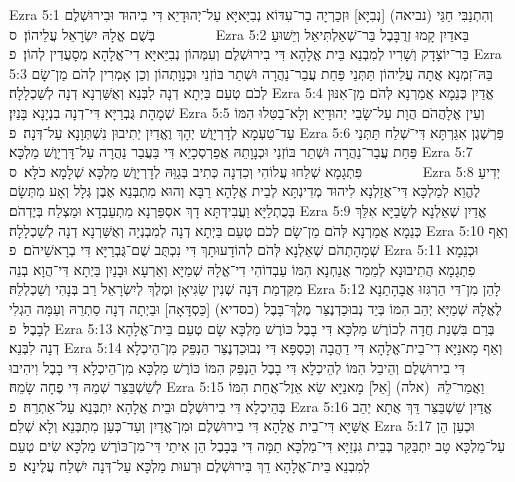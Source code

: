 Ezra 5:1	וְהִתְנַבִּי חַגַּי (נביאה) [נְבִיָּא] וּזְכַרְיָה בַר־עִדּוֹא נְבִיַּאיָּא עַל־יְהוּדָיֵא דִּי בִיהוּד וּבִירוּשְׁלֶם בְּשֻׁם אֱלָהּ יִשְׂרָאֵל עֲלֵיהוֹן׃ {ס}        
Ezra 5:2	בֵּאדַיִן קָמוּ זְרֻבָּבֶל בַּר־שְׁאַלְתִּיאֵל וְיֵשׁוּעַ בַּר־יוֹצָדָק וְשָׁרִיו לְמִבְנֵא בֵּית אֱלָהָא דִּי בִירוּשְׁלֶם וְעִמְּהוֹן נְבִיַּאיָּא דִי־אֱלָהָא מְסָעֲדִין לְהוֹן׃ {פ}
Ezra 5:3	בֵּהּ־זִמְנָא אֲתָה עֲלֵיהוֹן תַּתְּנַי פַּחַת עֲבַר־נַהֲרָה וּשְׁתַר בּוֹזְנַי וּכְנָוָתְהוֹן וְכֵן אָמְרִין לְהֹם מַן־שָׂם לְכֹם טְעֵם בַּיְתָא דְנָה לִבְּנֵא וְאֻשַּׁרְנָא דְנָה לְשַׁכְלָלָה׃
Ezra 5:4	אֱדַיִן כְּנֵמָא אֲמַרְנָא לְּהֹם מַן־אִנּוּן שְׁמָהָת גֻּבְרַיָּא דִּי־דְנָה בִנְיָנָא בָּנַיִן׃
Ezra 5:5	וְעֵין אֱלָהֲהֹם הֲוָת עַל־שָׂבֵי יְהוּדָיֵא וְלָא־בַטִּלוּ הִמּוֹ עַד־טַעְמָא לְדָרְיָוֶשׁ יְהָךְ וֶאֱדַיִן יְתִיבוּן נִשְׁתְּוָנָא עַל־דְּנָה׃ {פ}
Ezra 5:6	פַּרְשֶׁגֶן אִגַּרְתָּא דִּי־שְׁלַח תַּתְּנַי  פַּחַת עֲבַר־נַהֲרָה וּשְׁתַר בּוֹזְנַי וּכְנָוָתֵהּ אֲפַרְסְכָיֵא דִּי בַּעֲבַר נַהֲרָה עַל־דָּרְיָוֶשׁ מַלְכָּא׃
Ezra 5:7	פִּתְגָמָא שְׁלַחוּ עֲלוֹהִי וְכִדְנָה כְּתִיב בְּגַוֵּהּ לְדָרְיָוֶשׁ מַלְכָּא שְׁלָמָא כֹלָּא׃ {ס}        
Ezra 5:8	יְדִיעַ  לֶהֱוֵא לְמַלְכָּא דִּי־אֲזַלְנָא לִיהוּד מְדִינְתָּא לְבֵית אֱלָהָא רַבָּא וְהוּא מִתְבְּנֵא אֶבֶן גְּלָל וְאָע מִתְּשָׂם בְּכֻתְלַיָּא וַעֲבִידְתָּא דָךְ אסְפַּרְנָא מִתְעַבְדָא וּמַצְלַח בְּיֶדְהֹם׃
Ezra 5:9	אֱדַיִן שְׁאֵלְנָא לְשָׂבַיָּא אִלֵּךְ כְּנֵמָא אֲמַרְנָא לְּהֹם מַן־שָׂם לְכֹם טְעֵם בַּיְתָא דְנָה לְמִבְנְיָה וְאֻשַּׁרְנָא דְנָה לְשַׁכְלָלָה׃
Ezra 5:10	וְאַף שְׁמָהָתְהֹם שְׁאֵלְנָא לְּהֹם לְהוֹדָעוּתָךְ דִּי נִכְתֻּב שֻׁם־גֻּבְרַיָּא דִּי בְרָאשֵׁיהֹם׃ {פ}
Ezra 5:11	וּכְנֵמָא פִתְגָמָא הֲתִיבוּנָא לְמֵמַר אֲנַחְנָא הִמּוֹ עַבְדוֹהִי דִי־אֱלָהּ שְׁמַיָּא וְאַרְעָא וּבָנַיִן בַּיְתָא דִּי־הֲוָא בְנֵה מִקַּדְמַת דְּנָה שְׁנִין שַׂגִּיאָן וּמֶלֶךְ לְיִשְׂרָאֵל רַב בְּנָהִי וְשַׁכְלְלֵהּ׃
Ezra 5:12	לָהֵן מִן־דִּי הַרְגִּזוּ אֲבָהָתַנָא לֶאֱלָהּ שְׁמַיָּא יְהַב הִמּוֹ בְּיַד נְבוּכַדְנֶצַּר מֶלֶךְ־בָּבֶל (כסדיא) [כַּסְדָּאָה] וּבַיְתָה דְנָה סַתְרֵהּ וְעַמָּה הַגְלִי לְבָבֶל׃ {פ}
Ezra 5:13	בְּרַם בִּשְׁנַת חֲדָה לְכוֹרֶשׁ מַלְכָּא דִּי בָבֶל כּוֹרֶשׁ מַלְכָּא שָׂם טְעֵם בֵּית־אֱלָהָא דְנָה לִבְּנֵא׃
Ezra 5:14	וְאַף מָאנַיָּא דִי־בֵית־אֱלָהָא דִּי דַהֲבָה וְכַסְפָּא דִּי נְבוּכַדְנֶצַּר הַנְפֵּק מִן־הֵיכְלָא דִּי בִירוּשְׁלֶם וְהֵיבֵל הִמּוֹ לְהֵיכְלָא דִּי בָבֶל הַנְפֵּק הִמּוֹ כּוֹרֶשׁ מַלְכָּא מִן־הֵיכְלָא דִּי בָבֶל וִיהִיבוּ לְשֵׁשְׁבַּצַּר שְׁמֵהּ דִּי פֶחָה שָׂמֵהּ׃
Ezra 5:15	וַאֲמַר־לֵהּ  (אלה) [אֵל] מָאנַיָּא שֵׂא אֵזֶל־אֲחֵת הִמּוֹ בְּהֵיכְלָא דִּי בִירוּשְׁלֶם וּבֵית אֱלָהָא יִתְבְּנֵא עַל־אַתְרֵהּ׃ {פ}
Ezra 5:16	אֱדַיִן שֵׁשְׁבַּצַּר דֵּךְ אֲתָא יְהַב אֻשַּׁיָּא דִּי־בֵית אֱלָהָא דִּי בִירוּשְׁלֶם וּמִן־אֱדַיִן וְעַד־כְּעַן מִתְבְּנֵא וְלָא שְׁלִם׃
Ezra 5:17	וּכְעַן הֵן עַל־מַלְכָּא טָב יִתְבַּקַּר בְּבֵית גִּנְזַיָּא דִּי־מַלְכָּא תַמָּה דִּי בְּבָבֶל הֵן אִיתַי דִּי־מִן־כּוֹרֶשׁ מַלְכָּא שִׂים טְעֵם לְמִבְנֵא בֵּית־אֱלָהָא דֵךְ בִּירוּשְׁלֶם וּרְעוּת מַלְכָּא עַל־דְּנָה יִשְׁלַח עֲלֶינָא׃ {פ}
